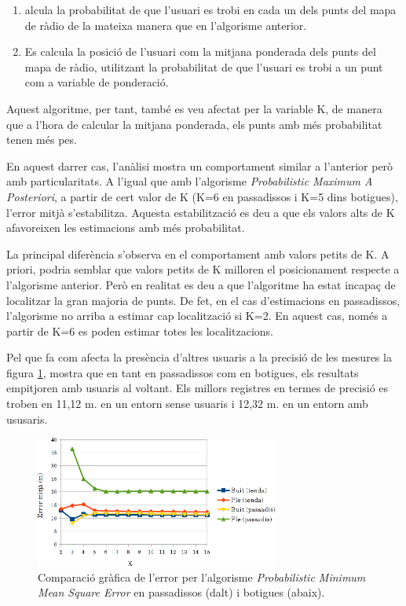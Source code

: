 \begin{enumerate}
    \item alcula la probabilitat de que l'usuari es trobi en cada un dels punts del mapa de ràdio de la mateixa manera que en l'algorisme anterior.
    \item Es calcula la posició de l'usuari com la mitjana ponderada dels punts del mapa de ràdio, utilitzant la probabilitat de que l'usuari es trobi a un punt com a variable de ponderació.
\end{enumerate}

Aquest algoritme, per tant, també es veu afectat per la variable K, de manera que a l'hora de calcular la mitjana ponderada, els punts amb més probabilitat tenen més pes.

En aquest darrer cas, l'anàlisi mostra un comportament similar a l'anterior però amb particularitats. A l'igual que amb l'algorisme \textit{Probabilistic Maximum A Posteriori}, a partir de cert valor de K (K=6 en passadissos i K=5 dins botigues), l'error mitjà s'estabilitza. Aquesta estabilització es deu a que els valors alts de K afavoreixen les estimacions amb més probabilitat.

La principal diferència s'observa en el comportament amb valors petits de K. A priori, podria semblar que valors petits de K milloren el posicionament respecte a l'algorisme anterior. Però  en realitat es deu a que l'algoritme ha estat incapaç de localitzar la gran majoria de punts. De fet, en el cas d'estimacions en passadissos, l'algorisme no arriba a estimar cap localització si K=2. En aquest cas, només a partir de K=6 es poden estimar totes les localitzacions.

Pel que fa com afecta la presència d'altres usuaris a la precisió de les mesures la figura \ref{fig:grafic_mitja_MMSE}, mostra que en tant en passadissos com en botigues, els resultats empitjoren amb usuaris al voltant. Els millors registres en termes de precisió es troben en 11,12 m. en un entorn sense usuaris i 12,32 m. en un entorn amb ususaris.

\begin{figure}[ht]
\begin{center}
\includegraphics[width=8cm]{imatges/mmse_mitja.png}
\caption{Comparació gràfica de l'error per l'algorisme \textit{Probabilistic Minimum Mean Square Error} en passadissos (dalt) i botigues (abaix).}
\label{fig:grafic_mitja_MMSE}
\end{center}
\end{figure}

